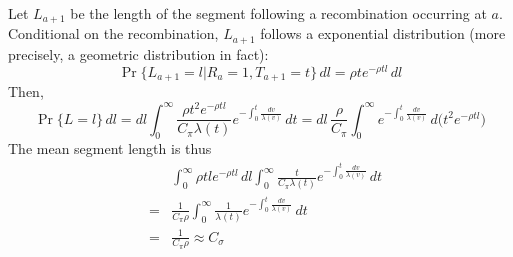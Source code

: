 \documentclass[pdftex,10pt]{article}
\begin{document}
\begin{rem}\label{cor:seglen}
  Let $L_{a+1}$ be the length of the segment following a recombination
  occurring at $a$. Conditional on the recombination, $L_{a+1}$ follows
  a exponential distribution (more precisely, a geometric distribution
  in fact):
  \[
  \Pr\{L_{a+1}=l|R_a=1,T_{a+1}=t\}\,dl = \rho te^{-\rho tl}\,dl
  \]
  Then,
  \[
  \Pr\{L=l\}\,dl=dl\int_0^{\infty}\frac{\rho t^2e^{-\rho tl}}{C_{\pi}\lambda(t)}e^{-\int_0^t\frac{dv}{\lambda(v)}}\,dt
  =dl\,\frac{\rho}{C_{\pi}}\int_0^{\infty}e^{-\int_0^t\frac{dv}{\lambda(v)}}\,d\Big(t^2e^{-\rho tl}\Big)
  \]
  The mean segment length is thus
  \begin{eqnarray*}
  &&\int_0^{\infty}\rho tl e^{-\rho tl}\,dl\int_0^{\infty}\frac{t}{C_{\pi}\lambda(t)}e^{-\int_0^t\frac{dv}{\lambda(v)}}\,dt\\
  &=&\frac{1}{C_{\pi}\rho}\int_0^{\infty}\frac{1}{\lambda(t)}e^{-\int_0^t\frac{dv}{\lambda(v)}}\,dt\\
  &=&\frac{1}{C_{\pi}\rho}\approx C_{\sigma}
  \end{eqnarray*}
\end{rem}
\end{document}
